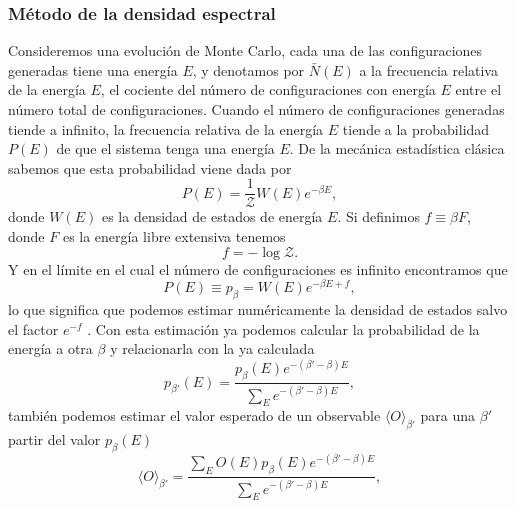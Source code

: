 \subsubsection{Método de la densidad espectral}\label{densidad_espectral-sec}

Consideremos una evolución de Monte Carlo, cada una de las configuraciones
generadas tiene una energía $E$, y denotamos por $\bar{N}(E)$ a la frecuencia
relativa de la energía $E$, el cociente del número de configuraciones con
energía $E$ entre el número total de configuraciones. Cuando el número de
configuraciones generadas tiende a infinito, la frecuencia relativa de la
energía $E$ tiende a la probabilidad $P(E)$ de que el sistema tenga una
energía $E$. De la mecánica estadística clásica sabemos que esta probabilidad
viene dada por
\begin{equation*}
P(E)=\frac{1}{\mathcal{Z}}W(E)e^{-\beta E},  
\end{equation*}
donde $W(E)$ es la densidad de estados de energía $E$. Si definimos $f\equiv
\beta F$, donde $F$ es la energía libre extensiva tenemos
\begin{equation*}
f=-\log \mathcal{Z}.
\end{equation*}
Y en el límite en el cual el número de configuraciones es infinito encontramos
que
\begin{equation}
P(E)\equiv p_{\beta}=W(E)e^{-\beta E+f} ,
\end{equation}
lo que significa que podemos estimar numéricamente la densidad de estados
salvo el factor $e^{-f}$ \cite{Juan:tesis}. Con esta estimación ya podemos calcular la
probabilidad de la energía a otra $\beta$ y relacionarla con la ya calculada
\begin{equation*}
p_{\beta'}(E)=\frac{p_{\beta}(E)e^{-(\beta'-\beta)E}}{\sum_E e^{-(\beta'-\beta)E}},
\end{equation*}
también podemos estimar el valor esperado de un observable $\langle
O\rangle_{\beta'}$  para una $\beta'$ partir del valor $p_{\beta}(E)$
\begin{equation*}
\langle O\rangle_{\beta'}=\frac{\sum_E O(E)p_{\beta}(E) e^{-(\beta'-\beta)E}}{\sum_E e^{-(\beta'-\beta)E}},
\end{equation*}

